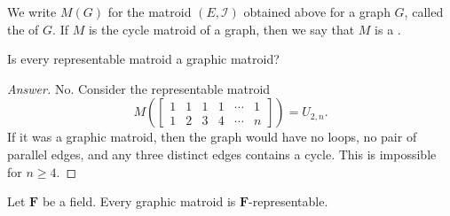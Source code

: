 We write \(M(G)\) for the matroid \((E, \mathcal{I})\) obtained above for a graph \(G\),
called the  of \(G\).
If \(M\) is the cycle matroid of a graph, then we say that \(M\) is a .

\begin{question}
    Is every representable matroid a graphic matroid?
\end{question}
\begin{proof}[Answer]
    No.
    Consider the representable matroid
    \begin{equation}
        M\left(
            \begin{bmatrix} 
                1 & 1 & 1 & 1 & \cdots & 1 \\
                1 & 2 & 3 & 4 & \cdots & n 
            \end{bmatrix}
        \right)
        = U_{2, n}.
    \end{equation}
    If it was a graphic matroid,
    then the graph would have no loops,
    no pair of parallel edges,
    and any three distinct edges contains a cycle.
    This is impossible for \(n \geq 4\).
\end{proof}

\begin{proposition}
    Let \(\mathbf{F}\) be a field.
    Every graphic matroid is \(\mathbf{F}\)-representable.
\end{proposition}


